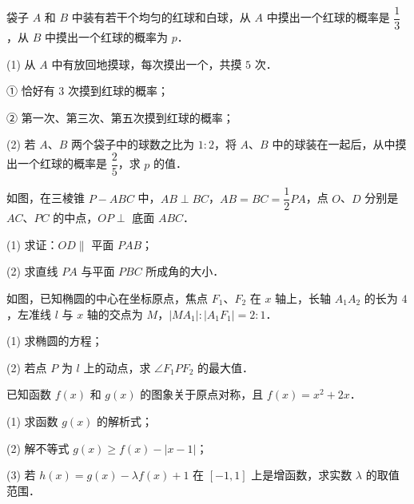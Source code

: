 \begin{question}
袋子 $A$ 和 $B$ 中装有若干个均匀的红球和白球，从 $A$ 中摸出一个红球的概率是 $\dfrac{1}{3}$，从 $B$ 中摸出一个红球的概率为 $p$．

(1) 从 $A$ 中有放回地摸球，每次摸出一个，共摸 $5$ 次．

① 恰好有 $3$ 次摸到红球的概率；

② 第一次、第三次、第五次摸到红球的概率；

(2) 若 $A$、$B$ 两个袋子中的球数之比为 $1:2$，将 $A$、$B$ 中的球装在一起后，从中摸出一个红球的概率是 $\dfrac{2}{5}$，求 $p$ 的值．

\Needspace{0.4\textheight}
\end{question}
\begin{question}
如图，在三棱锥 $P - ABC$ 中，$AB \perp BC$，$AB = BC = \dfrac{1}{2}PA$，点 $O$、$D$ 分别是 $AC$、$PC$ 的中点，$OP \perp$ 底面 $ABC$．

(1) 求证：$OD \parallel$ 平面 $PAB$；

(2) 求直线 $PA$ 与平面 $PBC$ 所成角的大小．
\nopagebreak[4]
\begin{center}\end{center}
\nopagebreak[4]
\Needspace{0.4\textheight}
\end{question}
\begin{question}
如图，已知椭圆的中心在坐标原点，焦点 $F_1$、$F_2$ 在 $x$ 轴上，长轴 $A_1A_2$ 的长为 $4$，左准线 $l$ 与 $x$ 轴的交点为 $M$，$|MA_1| : |A_1F_1| = 2:1$．

(1) 求椭圆的方程；

(2) 若点 $P$ 为 $l$ 上的动点，求 $\angle F_1PF_2$ 的最大值．
\nopagebreak[4]
\begin{center}\end{center}
\nopagebreak[4]
\end{question}
\begin{question}
已知函数 $f(x)$ 和 $g(x)$ 的图象关于原点对称，且 $f(x) = x^2 + 2x$．

(1) 求函数 $g(x)$ 的解析式；

(2) 解不等式 $g(x) \geqslant f(x) - |x - 1|$；

(3) 若 $h(x) = g(x) - \lambda f(x) + 1$ 在 $[-1, 1]$ 上是增函数，求实数 $\lambda$ 的取值范围．

\end{question}